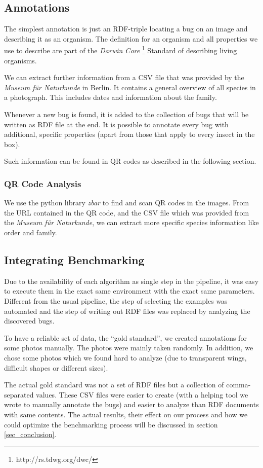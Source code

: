 \subsection{Annotations}
The simplest annotation is just an RDF-triple locating a bug on an image and describing it as an organism. 
The definition for an organism and all properties we use to describe are part of the \emph{Darwin Core} \footnote{http://rs.tdwg.org/dwc/} Standard of describing living organisms.

We can extract further information from a CSV file that was provided by the \emph{Museum für Naturkunde} in Berlin.
It contains a general overview of all species in a photograph.
This includes dates and information about the family.

Whenever a new bug is found, it is added to the collection of bugs that will be written as RDF file at the end.
It is possible to annotate every bug with additional, specific properties (apart from those that apply to every insect in the box).

Such information can be found in QR codes as described in the following section.

\subsubsection{QR Code Analysis}
We use the python library \textit{zbar} to find and scan QR codes in the images.
From the URL contained in the QR code, and the CSV file which was provided from the \emph{Museum für Naturkunde}, we can extract more specific species information like order and family.

\subsection{Integrating Benchmarking}
Due to the availability of each algorithm as single step in the pipeline, it was easy to execute them in the exact same environment with the exact same parameters. 
Different from the usual pipeline, the step of selecting the examples was automated and the step of writing out RDF files was replaced by analyzing the discovered bugs.

To have a reliable set of data, the ``gold standard'', we created annotations for some photos manually. 
The photos were mainly taken randomly.
In addition, we chose some photos which we found hard to analyze (due to transparent wings, difficult shapes or different sizes).

The actual gold standard was not a set of RDF files but a collection of comma-separated values. 
These CSV files were easier to create (with a helping tool we wrote to manually annotate the bugs) and easier to analyze than RDF documents with same contents.
The actual results, their effect on our process and how we could optimize the benchmarking process will be discussed in section \ref{sec_conclusion}.